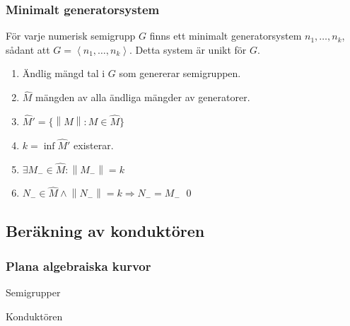 \documentclass{beamer}
\begin{document}
\begin{frame}
	\frametitle{Minimalt generatorsystem}
\begin{Theorem}
	För varje numerisk semigrupp $G$ finns ett minimalt generatorsystem $n_1, \ldots, n_k$, sådant att $G = \left<n_1, \ldots, n_k\right>$. Detta system är unikt för $G$.
\end{Theorem}

\begin{enumerate}
	\item<3-> Ändlig mängd tal i $G$ som genererar semigruppen.
	\item<4-> $\widehat{M}$ mängden av alla ändliga mängder av generatorer.
	\item<5-> $\widehat{M}' = \{ \left\|M\right\| : M \in \widehat{M}\}$
	\item<6-> $k = \inf \widehat{M}'$ existerar.
	\item<7-> $\exists M_- \in \widehat{M} : \left\|M_-\right\|=k$
	\item<8-> $N_- \in \widehat{M} \wedge \left\|N_-\right\|=k \Longrightarrow N_- = M_-$
	\qed
\end{enumerate}\end{frame}

\subsection{Beräkning av konduktören}

\begin{frame}
	\frametitle{Plana algebraiska kurvor}
	\begin{center}
		\Large Semigrupper
		
		Konduktören
	\end{center}
\end{frame}
\end{document}
